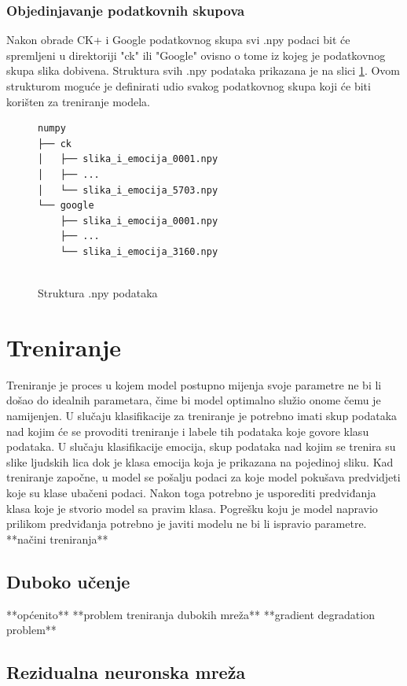 \documentclass[times, utf8, zavrsni,numeric]{fer}
\begin{document}
\subsection{Objedinjavanje podatkovnih skupova}
Nakon obrade CK+ i Google podatkovnog skupa svi .npy podaci bit će spremljeni u direktoriji "ck" ili "Google" ovisno o tome iz kojeg je podatkovnog skupa slika dobivena. Struktura svih .npy podataka prikazana je na slici \ref{pic:npy_structure}. Ovom strukturom moguće je definirati udio svakog podatkovnog skupa koji će biti korišten za treniranje modela.


\begin{figure}[H]
\centering
\begin{Verbatim}[fontsize=\small]
numpy
├── ck
│   ├── slika_i_emocija_0001.npy
│   ├── ...
│   └── slika_i_emocija_5703.npy
└── google
    ├── slika_i_emocija_0001.npy
    ├── ...
    └── slika_i_emocija_3160.npy
    

\end{Verbatim}
\caption{Struktura .npy podataka}
\label{pic:npy_structure}
\end{figure}



\chapter{Treniranje}
Treniranje je proces u kojem model postupno mijenja svoje parametre ne bi li došao do idealnih parametara, čime bi model optimalno služio onome čemu je namijenjen. U slučaju klasifikacije za treniranje je potrebno imati skup podataka nad kojim će se provoditi treniranje i labele tih podataka koje govore klasu podataka. U slučaju klasifikacije emocija, skup podataka nad kojim se trenira su slike ljudskih lica dok je klasa emocija koja je prikazana na pojedinoj sliku. Kad treniranje započne, u model se pošalju podaci za koje model pokušava predvidjeti koje su klase ubačeni podaci. Nakon toga potrebno je usporediti predviđanja klasa koje je stvorio model sa pravim klasa. Pogrešku koju je model napravio prilikom predviđanja potrebno je javiti modelu ne bi li ispravio parametre. 
**načini treniranja**

\section{Duboko učenje}
**općenito**
**problem treniranja dubokih mreža**	
**gradient degradation problem**


\section{Rezidualna neuronska mreža}
\end{document}
